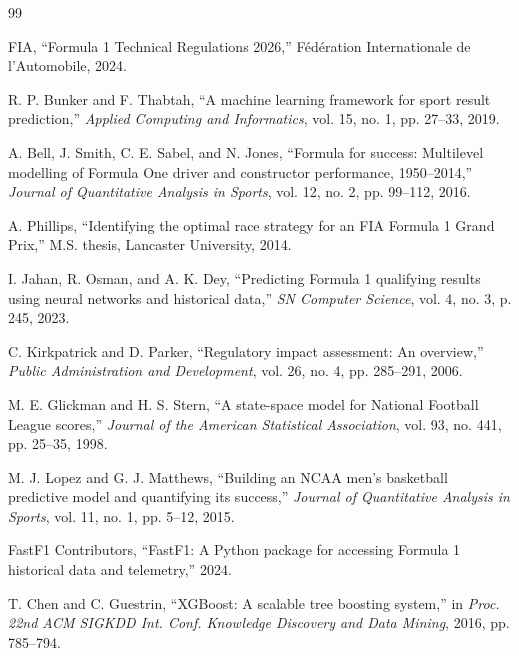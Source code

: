 \documentclass[conference]{IEEEtran}
\begin{document}
\begin{thebibliography}{99}

FIA, ``Formula 1 Technical Regulations 2026,'' F\'ed\'eration Internationale de l'Automobile, 2024.

R. P. Bunker and F. Thabtah, ``A machine learning framework for sport result prediction,'' \textit{Applied Computing and Informatics}, vol. 15, no. 1, pp. 27--33, 2019.

A. Bell, J. Smith, C. E. Sabel, and N. Jones, ``Formula for success: Multilevel modelling of Formula One driver and constructor performance, 1950--2014,'' \textit{Journal of Quantitative Analysis in Sports}, vol. 12, no. 2, pp. 99--112, 2016.

A. Phillips, ``Identifying the optimal race strategy for an FIA Formula 1 Grand Prix,'' M.S. thesis, Lancaster University, 2014.

I. Jahan, R. Osman, and A. K. Dey, ``Predicting Formula 1 qualifying results using neural networks and historical data,'' \textit{SN Computer Science}, vol. 4, no. 3, p. 245, 2023.

C. Kirkpatrick and D. Parker, ``Regulatory impact assessment: An overview,'' \textit{Public Administration and Development}, vol. 26, no. 4, pp. 285--291, 2006.

M. E. Glickman and H. S. Stern, ``A state-space model for National Football League scores,'' \textit{Journal of the American Statistical Association}, vol. 93, no. 441, pp. 25--35, 1998.

M. J. Lopez and G. J. Matthews, ``Building an NCAA men's basketball predictive model and quantifying its success,'' \textit{Journal of Quantitative Analysis in Sports}, vol. 11, no. 1, pp. 5--12, 2015.

FastF1 Contributors, ``FastF1: A Python package for accessing Formula 1 historical data and telemetry,'' 2024.

T. Chen and C. Guestrin, ``XGBoost: A scalable tree boosting system,'' in \textit{Proc. 22nd ACM SIGKDD Int. Conf. Knowledge Discovery and Data Mining}, 2016, pp. 785--794.

\end{thebibliography}
\end{document}
